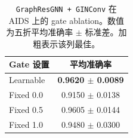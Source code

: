 \begin{table}[t]
\centering
\footnotesize
\caption{\texttt{GraphResGNN + GINConv} 在 AIDS 上的 gate ablation。数值为五折平均准确率 $\pm$ 标准差。加粗表示该列最佳。}
\label{tab:aids_gate_ablation}
\begin{tabular}{lc}
\toprule
Gate 设置 & 平均准确率 \\
\midrule
Learnable & \textbf{0.9620 $\pm$ 0.0089} \\
Fixed 0.0 & 0.9150 $\pm$ 0.0138 \\
Fixed 0.5 & 0.9605 $\pm$ 0.0144 \\
Fixed 1.0 & 0.9480 $\pm$ 0.0300 \\
\bottomrule
\end{tabular}
\end{table}
